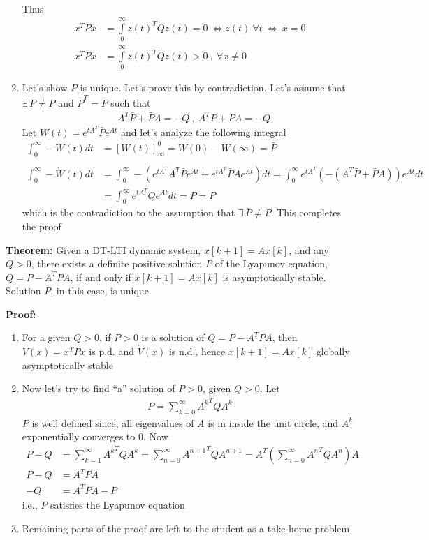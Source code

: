 \documentclass[twoside]{article}
\begin{document}
\begin{enumerate}
\begin{align*}
\end{align*}
%
Thus 
%
\begin{align*}
x^T P x &= \int\limits_{0}^{\infty} z(t)^T Q z(t) = 0 \ \iff z(t) \ \forall t 
\ \iff \ x = 0
\\
x^T P x &= \int\limits_{0}^{\infty} z(t)^T Q z(t) > 0 \ , \ \forall x \neq 0
\end{align*}
%
\item Let's show $P$ is unique. Let's prove this by contradiction.
Let's assume that $\exists \, \bar{P} \neq P$ and $\bar{P}^T = \bar{P}$ 
such that  
%
\begin{align*}
&A^T \bar{P} + \bar{P} A = - Q \ , \ A^T P + P A = - Q
\end{align*}
%
Let $W(t) = e^{t A^T} \bar{P} e^{A t}$ and let's analyze the following integral  
%
\begin{align*}
\int_{0}^{\infty} - \dot{W}(t) dt &= \left[ W(t) \right]^{0}_{\infty} = W(0) - W(\infty) = \bar{P}
\\
\\
\int_{0}^{\infty} - \dot{W}(t) dt &=
\int_{0}^{\infty} - \left( e^{t A^T} A^T \bar{P} e^{A t} +
e^{t A^T}\bar{P} A e^{A t} 
\right) dt =
\int_{0}^{\infty} e^{t A^T} ( - \left( A^T \bar{P} +
 \bar{P} A \right) ) e^{A t} dt
 \\
 &= \int_{0}^{\infty} e^{t A^T} Q e^{A t} dt = P = \bar{P}
\end{align*}
%
which is the contradiction to the assumption that $\exists \, \bar{P} \neq P$. This completes the proof
\end{enumerate}

\textbf{Theorem:} Given a DT-LTI dynamic system, $x[k+1] = A x[k]$, and 
any $Q>0$, there exists a definite positive solution $P$ of the Lyapunov equation, $Q = P - A^T P A $, if and only if $x[k+1] = A x[k]$ is asymptotically stable. Solution $P$, in this case, is unique.

\textbf{Proof:} 
\begin{enumerate}
\item For a given $Q > 0$, if $P > 0$ is a solution of $Q = P - A^T P A$, then $V(x) = x^T P x$ is p.d. and $\dot{V}(x)$ is n.d., hence
$x[k+1] = A x[k]$ globally asymptotically stable
%
\item Now let's try to find ``a'' solution of $P > 0$, given $Q>0$. Let
%
\begin{align*}
P = \sum\limits_{k=0}^{\infty} {A^{k}}^T Q A^k \end{align*}
%
$P$ is well defined since, all eigenvalues of $A$ is in inside the unit circle, and 
$A^k$ exponentially converges to $0$. Now
%
\begin{align*}
P - Q &= \sum\limits_{k=1}^{\infty} {A^{k}}^T Q A^k = 
\sum\limits_{n=0}^{\infty} {A^{n+1}}^T Q A^{n+1} 
= A^T \left( \sum\limits_{n=0}^{\infty} {A^{n}}^T Q A^{n} \right) A
\\
P - Q &= A^T P A
\\
-Q &= A^T P A - P
\end{align*} 
%
i.e., $P$ satisfies the Lyapunov equation
%
\item Remaining parts of the proof are left to the student as a take-home problem
\end{enumerate}

\end{document}
